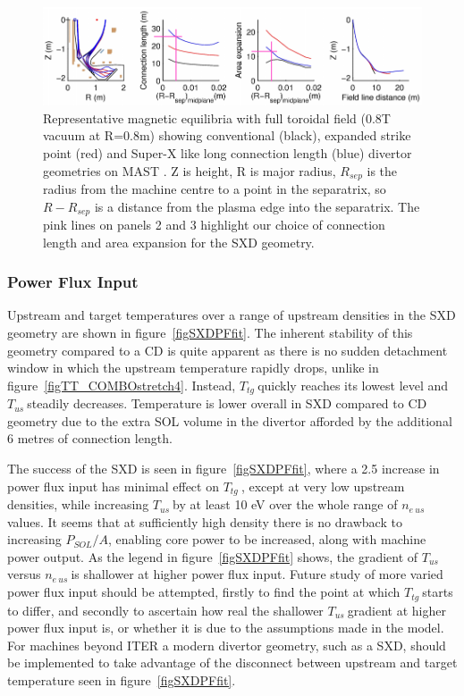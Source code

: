 \documentclass[12pt]{article}  %
\providecommand{\neus}{$n_{e~us}~$} %
\providecommand{\Tus}{$T_{us}~$} %
\providecommand{\Ttg}{$T_{tg}~$} %
\begin{document}
\begin{figure}[h]
\includegraphics[scale=0.75]{Figures/MASTUdesignpapersFig2_2.png}
\centering
\caption{Representative magnetic equilibria with full toroidal field (0.8T vacuum at R=0.8m) showing conventional (black), expanded strike point (red) and Super-X like long connection length (blue) divertor geometries on MAST \cite{Fishpool2013}. Z is height, R is major radius, $ R_{sep} $ is the radius from the machine centre to a point in the separatrix, so $ R - R_{sep} $ is a distance from the plasma edge into the separatrix. The pink lines on panels 2 and 3 highlight our choice of connection length and area expansion for the SXD geometry.}\label{figMASTUdesignpapersFig2}
\end{figure}


\subsubsection{Power Flux Input}\label{sssecPF}
Upstream and target temperatures over a range of upstream densities in the SXD geometry are shown in figure~\ref{figSXDPFfit}. The inherent stability of this geometry compared to a CD is quite apparent as there is no sudden detachment window in which the upstream temperature rapidly drops, unlike in figure~\ref{figTT_COMBOstretch4}. Instead, \Ttg quickly reaches its lowest level and \Tus steadily decreases. Temperature is lower overall in SXD compared to CD geometry due to the extra SOL volume in the divertor afforded by the additional 6 metres of connection length. 

The success of the SXD is seen in figure~\ref{figSXDPFfit}, where a 2.5 increase in power flux input has minimal effect on \Ttg, except at very low upstream densities, while increasing \Tus by at least 10 eV over the whole range of \neus values. It seems that at sufficiently high density there is no drawback to increasing $P_{SOL}/A$, enabling core power to be increased, along with machine power output. As the legend in figure~\ref{figSXDPFfit} shows, the gradient of \Tus versus \neus is shallower at higher power flux input. Future study of more varied power flux input should be attempted, firstly to find the point at which \Ttg starts to differ, and secondly to ascertain how real the shallower \Tus gradient at higher power flux input is, or whether it is due to the assumptions made in the model. For machines beyond ITER a modern divertor geometry, such as a SXD, should be implemented to take advantage of the disconnect between upstream and target temperature seen in figure~\ref{figSXDPFfit}.
\end{document}
